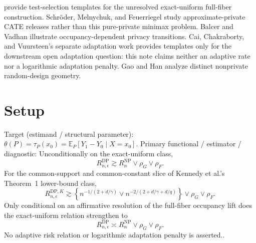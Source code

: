 \documentclass{article}
\begin{document}
provide test-selection templates for the unresolved exact-uniform full-fiber construction.  Schröder, Melnychuk, and Feuerriegel study approximate-private CATE releases rather than this pure-private minimax problem.  Balcer and Vadhan illustrate occupancy-dependent privacy transitions.  Cai, Chakraborty, and Vuursteen's separate adaptation work provides templates only for the downstream open adaptation question: this note claims neither an adaptive rate nor a logarithmic adaptation penalty.  Gao and Han analyze distinct nonprivate random-design geometry.

\section{Setup}

Target (estimand / structural parameter): \(\theta(P)=\tau_P(x_0)=\mathbb E_P[Y_1-Y_0\mid X=x_0]\).
Primary functional / estimator / diagnostic: Unconditionally on the exact-uniform class,
\[
R_{n,\epsilon}^{\mathrm{DP}}
\gtrsim R_n^{\mathrm{NP}}\vee\rho_G\vee\rho_F.
\]
For the common-support and common-constant slice of Kennedy et al.'s Theorem~1 lower-bound class,
\[
R_{n,\epsilon}^{\mathrm{DP},K}
\gtrsim
\left\{n^{-1/(2+d/\gamma)}\vee
n^{-2/(2+d/\gamma+d/q)}\right\}
\vee\rho_G\vee\rho_F.
\]
Only conditional on an affirmative resolution of the full-fiber occupancy lift does the exact-uniform relation strengthen to
\[
R_{n,\epsilon}^{\mathrm{DP}}
\asymp R_n^{\mathrm{NP}}\vee\rho_G\vee\rho_F.
\]
No adaptive risk relation or logarithmic adaptation penalty is asserted..
\end{document}
